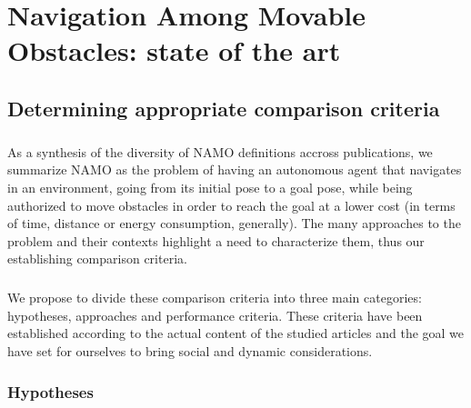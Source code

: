 
\chapter{Navigation Among Movable Obstacles: state of the art} %

\label{Chapter2} %

\section{Determining appropriate comparison criteria}

\paragraph{} As a synthesis of the diversity of NAMO definitions accross publications, we summarize NAMO as the problem of having an autonomous agent that navigates in an environment, going from its initial pose to a goal pose, while being authorized to move obstacles in order to reach the goal at a lower cost (in terms of time, distance or energy consumption, generally). The many approaches to the problem and their contexts highlight a need to characterize them, thus our establishing comparison criteria.

\paragraph{} We propose to divide these comparison criteria into three main categories: hypotheses, approaches and performance criteria. These criteria have been established according to the actual content of the studied articles and the goal we have set for ourselves to bring social and dynamic considerations.

\subsection{Hypotheses}

